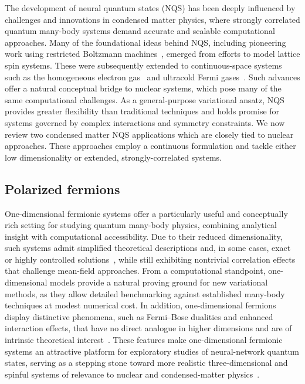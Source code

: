 The development of neural quantum states (NQS) has been deeply influenced by challenges and innovations in condensed matter physics, where strongly correlated quantum many-body systems demand accurate and scalable computational approaches. Many of the foundational ideas behind NQS, including pioneering work using restricted Boltzmann machines~\cite{carleo_solving_2017}, emerged from efforts to model lattice spin systems. These were subsequently extended to continuous-space systems such as the homogeneous electron gas~\cite{pescia_message-passing_2024} and ultracold Fermi gases~\cite{kim_neural-network_2024}. Such advances offer a natural conceptual bridge to nuclear systems, which pose many of the same computational challenges. As a general-purpose variational ansatz, NQS provides greater flexibility than traditional techniques and holds promise for systems governed by complex interactions and symmetry constraints. We now review two condensed matter NQS applications which are closely tied to nuclear approaches. These approaches employ a continuous formulation and tackle either low dimensionality or extended, strongly-correlated systems.

\subsection{Polarized fermions}
\label{sub:polarized_fermions} 


One-dimensional fermionic systems offer a particularly useful and conceptually rich setting for studying quantum many-body physics, combining analytical insight with computational accessibility.
Due to their reduced dimensionality, such systems admit simplified theoretical descriptions and, in some cases, exact or highly controlled solutions~\cite{busch_two_1998, bethe_zur_1931}, while still exhibiting nontrivial correlation effects that challenge mean-field approaches.
From a computational standpoint, one-dimensional models provide a natural proving ground for new variational methods, as they allow detailed benchmarking against established many-body techniques at modest numerical cost.
In addition, one-dimensional fermions display distinctive phenomena, such as Fermi--Bose dualities and enhanced interaction effects, that have no direct analogue in higher dimensions and are of intrinsic theoretical interest~\cite{girardeau_relationship_1960,valiente_bose-fermi_2020,girardeau_effective_2004}.
These features make one-dimensional fermionic systems an attractive platform for exploratory studies of neural-network quantum states, serving as a stepping stone toward more realistic three-dimensional and spinful systems of relevance to nuclear and condensed-matter physics~\cite{keeble_machine_2020,adams_variational_2021,gnech_nuclei_2022,lovato_hidden-nucleons_2022}.


